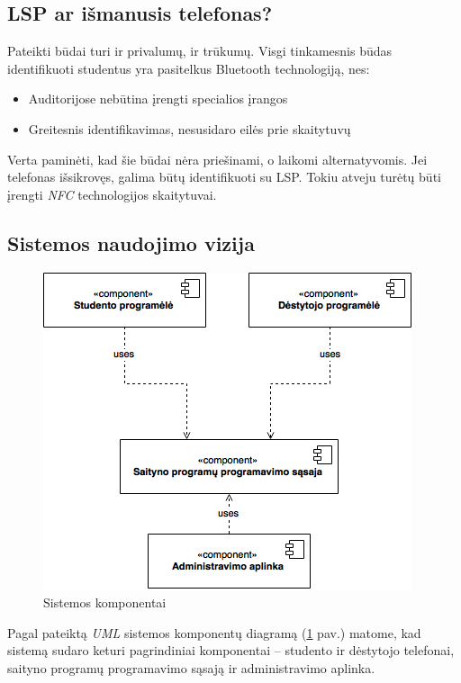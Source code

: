 \documentclass{VUMIFPSkursinis}
\begin{document}
\subsection{LSP ar išmanusis telefonas?}
Pateikti būdai turi ir privalumų, ir trūkumų. Visgi tinkamesnis būdas identifikuoti studentus yra pasitelkus Bluetooth technologiją, nes:

\begin{itemize}
	\item Auditorijose nebūtina įrengti specialios įrangos
	\item Greitesnis identifikavimas, nesusidaro eilės prie skaitytuvų
\end{itemize}

Verta paminėti, kad šie būdai nėra priešinami, o laikomi alternatyvomis. Jei telefonas išsikrovęs, galima būtų identifikuoti su LSP. Tokiu atveju turėtų būti įrengti \textit{NFC} technologijos skaitytuvai.

\subsection{Sistemos naudojimo vizija}

\begin{figure}[H]
	\centering
	\includegraphics[scale=0.5]{img/kursinio_component}
	\caption{Sistemos komponentai}
	\label{img:componentDiagram}
\end{figure}

Pagal pateiktą \textit{UML} sistemos komponentų diagramą (\ref{img:componentDiagram} pav.) matome, kad sistemą sudaro keturi pagrindiniai komponentai – studento ir dėstytojo telefonai, saityno programų programavimo sąsają ir administravimo aplinka.
\end{document}
